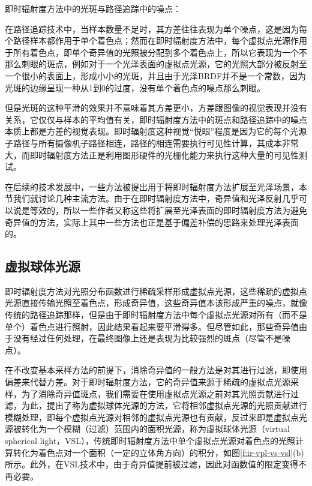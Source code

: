 \begin{myshaded}
	\indent 即时辐射度方法中的光斑与路径追踪中的噪点：
	
	\indent 在路径追踪技术中，当样本数量不足时，其方差往往表现为单个噪点，这是因为每个路径样本都作用于单个着色点；然而在即时辐射度方法中，每个虚拟点光源作用于所有着色点，即单个奇异值的光照被分配到多个着色点上，所以它表现为一个不那么刺眼的斑点，例如对于一个光泽表面的虚拟点光源，它的光照大部分被反射至一个很小的表面上，形成小小的光斑，并且由于光泽BRDF并不是一个常数，因为光斑的边缘呈现一种从1到0的过度，没有单个着色点的噪点那么刺眼。
	
	\indent 但是光斑的这种平滑的效果并不意味着其方差更小，方差跟图像的视觉表现并没有关系，它仅仅与样本的平均值有关，即时辐射度方法中的斑点和路径追踪中的噪点本质上都是方差的视觉表现。即时辐射度这种视觉“悦眼”程度是因为它的每个光源子路径与所有摄像机子路径相连，路径的相连需要执行可见性计算，其成本非常大，而即时辐射度方法正是利用图形硬件的光栅化能力来执行这种大量的可见性测试。
\end{myshaded}

在后续的技术发展中，一些方法被提出用于将即时辐射度方法扩展至光泽场景，本节我们就讨论几种主流方法。由于在即时辐射度方法中，奇异值和光泽反射几乎可以说是等效的，所以一些作者又称这些将扩展至光泽表面的即时辐射度方法为避免奇异值的方法，实际上其中一些方法也正是基于偏差补偿的思路来处理光泽表面的。




\subsection{虚拟球体光源}
即时辐射度方法对光照分布函数进行稀疏采样形成虚拟点光源，这些稀疏的虚拟点光源直接传输光照至着色点，形成奇异值，这些奇异值本该形成严重的噪点，就像传统的路径追踪那样，但是由于即时辐射度方法中每个虚拟点光源对所有（而不是单个）着色点进行照射，因此结果看起来要平滑得多。但尽管如此，那些奇异值由于没有经过任何处理，在最终图像上还是表现为比较强烈的斑点（尽管不是噪点）。

在不改变基本采样方法的前提下，消除奇异值的一般方法是对其进行过滤，即使用偏差来代替方差。对于即时辐射度方法，它的奇异值来源于稀疏的虚拟点光源采样，为了消除奇异值斑点，我们需要在使用虚拟点光源之前对其光照贡献进行过滤，为此，\cite{a:VirtualSphericalLightsforMany-LightRenderingofGlossyScenes}提出了称为虚拟球体光源的方法，它将相邻虚拟点光源的光照贡献进行模糊处理，即每个虚拟点光源对相邻的虚拟点光源也有贡献，反过来即是虚拟点光源被转化为一个模糊（过滤）范围内的面积光源，称为虚拟球体光源（virtual spherical light，VSL），传统即时辐射度方法中单个虚拟点光源对着色点的光照计算转化为着色点对一个面积（一定的立体角方向）的积分，如图\ref{f:ir-vpl-vs-vsl}(b)所示。此外，在VSL技术中，由于奇异值提前被过滤，因此对函数值的限定变得不再必要。

